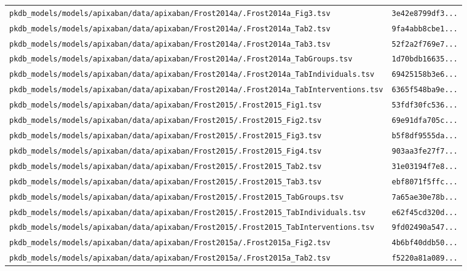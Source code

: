 \documentclass{article}
\begin{document}
\begin{longtable}{ll}
\texttt{pkdb\_models/models/apixaban/data/apixaban/Frost2014a/.Frost2014a\_Fig3.tsv} & \texttt{3e42e8799df3...} \\
\texttt{pkdb\_models/models/apixaban/data/apixaban/Frost2014a/.Frost2014a\_Tab2.tsv} & \texttt{9fa4abb8cbe1...} \\
\texttt{pkdb\_models/models/apixaban/data/apixaban/Frost2014a/.Frost2014a\_Tab3.tsv} & \texttt{52f2a2f769e7...} \\
\texttt{pkdb\_models/models/apixaban/data/apixaban/Frost2014a/.Frost2014a\_TabGroups.tsv} & \texttt{1d70bdb16635...} \\
\texttt{pkdb\_models/models/apixaban/data/apixaban/Frost2014a/.Frost2014a\_TabIndividuals.tsv} & \texttt{69425158b3e6...} \\
\texttt{pkdb\_models/models/apixaban/data/apixaban/Frost2014a/.Frost2014a\_TabInterventions.tsv} & \texttt{6365f548ba9e...} \\
\texttt{pkdb\_models/models/apixaban/data/apixaban/Frost2015/.Frost2015\_Fig1.tsv} & \texttt{53fdf30fc536...} \\
\texttt{pkdb\_models/models/apixaban/data/apixaban/Frost2015/.Frost2015\_Fig2.tsv} & \texttt{69e91dfa705c...} \\
\texttt{pkdb\_models/models/apixaban/data/apixaban/Frost2015/.Frost2015\_Fig3.tsv} & \texttt{b5f8df9555da...} \\
\texttt{pkdb\_models/models/apixaban/data/apixaban/Frost2015/.Frost2015\_Fig4.tsv} & \texttt{903aa3fe27f7...} \\
\texttt{pkdb\_models/models/apixaban/data/apixaban/Frost2015/.Frost2015\_Tab2.tsv} & \texttt{31e03194f7e8...} \\
\texttt{pkdb\_models/models/apixaban/data/apixaban/Frost2015/.Frost2015\_Tab3.tsv} & \texttt{ebf8071f5ffc...} \\
\texttt{pkdb\_models/models/apixaban/data/apixaban/Frost2015/.Frost2015\_TabGroups.tsv} & \texttt{7a65ae30e78b...} \\
\texttt{pkdb\_models/models/apixaban/data/apixaban/Frost2015/.Frost2015\_TabIndividuals.tsv} & \texttt{e62f45cd320d...} \\
\texttt{pkdb\_models/models/apixaban/data/apixaban/Frost2015/.Frost2015\_TabInterventions.tsv} & \texttt{9fd02490a547...} \\
\texttt{pkdb\_models/models/apixaban/data/apixaban/Frost2015a/.Frost2015a\_Fig2.tsv} & \texttt{4b6bf40ddb50...} \\
\texttt{pkdb\_models/models/apixaban/data/apixaban/Frost2015a/.Frost2015a\_Tab2.tsv} & \texttt{f5220a81a089...} \\

\end{longtable}
\end{document}
